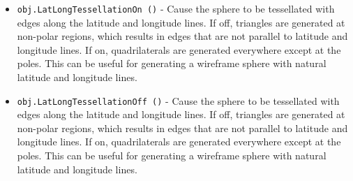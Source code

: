 \begin{itemize}
\item  \verb|obj.LatLongTessellationOn ()| -  Cause the sphere to be tessellated with edges along the latitude
 and longitude lines. If off, triangles are generated at non-polar
 regions, which results in edges that are not parallel to latitude and
 longitude lines. If on, quadrilaterals are generated everywhere
 except at the poles. This can be useful for generating a wireframe
 sphere with natural latitude and longitude lines.

\item  \verb|obj.LatLongTessellationOff ()| -  Cause the sphere to be tessellated with edges along the latitude
 and longitude lines. If off, triangles are generated at non-polar
 regions, which results in edges that are not parallel to latitude and
 longitude lines. If on, quadrilaterals are generated everywhere
 except at the poles. This can be useful for generating a wireframe
 sphere with natural latitude and longitude lines.

\end{itemize}

